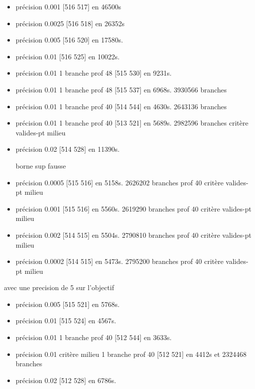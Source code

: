 \documentclass{article}
\begin{document}
\begin{itemize}
\item pr\'ecision  0.001  [516 517] en 46500s

\item pr\'ecision  0.0025  [516 518] en 26352s

\item  pr\'ecision 0.005  [516 520] en  17580s.

\item pr\'ecision 0.01  [516 525] en  10022s.
\item pr\'ecision 0.01  1 branche prof 48 [515 530] en  9231s.
\item pr\'ecision 0.01  1 branche prof 48 [515 537] en  6968s.  3930566 branches
\item pr\'ecision 0.01  1 branche prof 40 [514 544] en  4630s.  2643136 branches

\item pr\'ecision 0.01  1 branche prof 40 [513 521] en  5689s.  2982596 branches  critère valides-pt milieu

\item pr\'ecision 0.02  [514 528] en 11390s.

borne sup fausse
\item pr\'ecision 0.0005  [515 516] en 5158s.  2626202 branches  prof 40 critère valides-pt milieu
\item pr\'ecision 0.001  [515 516] en 5560s.  2619290 branches  prof 40 critère valides-pt milieu
\item pr\'ecision 0.002  [514 515] en 5504s.  2790810 branches  prof 40 critère valides-pt milieu
\item pr\'ecision 0.0002  [514 515] en 5473s.  2795200 branches  prof 40 critère valides-pt milieu


\end{itemize}

avec une precision de 5 sur l'objectif
\begin{itemize}
\item  pr\'ecision 0.005  [515 521] en  5768s.


\item pr\'ecision 0.01  [515 524] en  4567s.
\item pr\'ecision 0.01 1 branche prof 40 [512 544] en 3633s.
\item pr\'ecision 0.01 crit\`ere milieu 1 branche prof 40 [512 521] en 4412s et  2324468 branches


\item pr\'ecision 0.02  [512 528] en 6786s.

\end{itemize}
\end{document}
